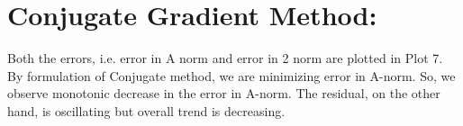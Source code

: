 \documentclass[12pt,a4paper]{report}
\begin{document}
\section{Conjugate Gradient Method:}
Both the errors, i.e. error in A norm and error in 2 norm are plotted in Plot 7.
\\
By formulation of Conjugate method, we are minimizing error in A-norm. So, we observe monotonic decrease in the error in A-norm. The residual, on the other hand, is oscillating but overall trend is decreasing.
\end{document}
